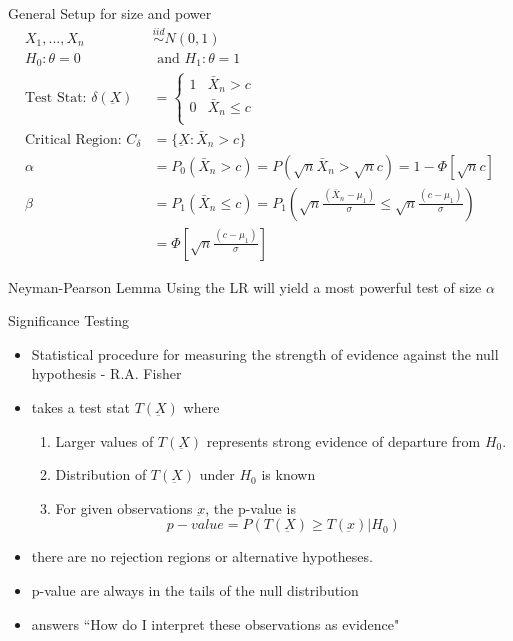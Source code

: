 \documentclass[avery5388,grid,frame]{flashcards}
\begin{document}
\begin{flashcard}{General Setup for size and power}
{\begin{align*}
X_1,...,X_n&\overset{iid}{\sim}N(0,1)\\
H_0:\theta=0&\textrm{ and } H_1:\theta=1\\
\textrm{Test Stat: }\delta(\underbar{X})&=\begin{cases}
1&\bar{X}_n>c\\
0&\bar{X}_n\leq c\\
\end{cases}\\
\textrm{Critical Region: }C_\delta&=\{\underbar{X}:\bar{X}_n>c\}\\
\alpha&=P_0(\bar{X}_n>c)=P(\sqrt{n}\bar{X}_n>\sqrt{n}c)=1-\Phi[\sqrt{n}c]\\
\beta&=P_1(\bar{X}_n\leq c)=P_1\left(\sqrt{n}\frac{(\bar{X}_n-\mu_1)}{\sigma}\leq\sqrt{n}\frac{(c-\mu_1)}{\sigma}\right)\\
&=\Phi\left[\sqrt{n}\frac{(c-\mu_1)}{\sigma}\right]
\end{align*}}
\end{flashcard}
\begin{flashcard}[Definition]{Neyman-Pearson Lemma}
\bigskip\bigskip\bigskip
Using the LR will yield a most powerful test of size $\alpha$
\end{flashcard}
\begin{flashcard}[Definition]{Significance Testing}
\begin{itemize}
\item Statistical procedure for measuring the strength of evidence against the null hypothesis - R.A. Fisher 
\item takes a test stat $T(\underbar{X})$ where 
\begin{enumerate}
\item Larger values of $T(\underbar{X})$ represents strong evidence of departure from $H_0$.
\item Distribution of $T(\underbar{X})$ under $H_0$ is known
\item For given observations $\underbar{x}$, the p-value is
\begin{equation*}
p-value=P(T(\underbar{X})\geq T(\underbar{x})|H_0)
\end{equation*}
\end{enumerate}
\item there are no rejection regions or alternative hypotheses.
\item p-value are always in the tails of the null distribution
\item answers ``How do I interpret these observations as evidence"
\end{itemize}
\end{flashcard}
\end{document}
